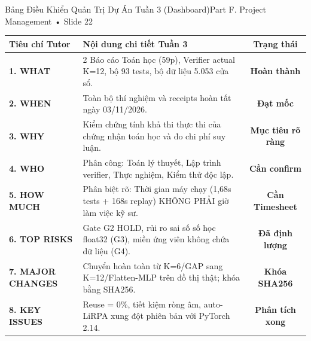 \documentclass[aspectratio=169, 10pt]{beamer}
\begin{document}
\begin{frame}{Bảng Điều Khiển Quản Trị Dự Án Tuần 3 (Dashboard)}{Part F. Project Management • Slide 22}
    \tiny
    \begin{tabular}{lp{6cm}c}
        \toprule
        \textbf{Tiêu chí Tutor} & \textbf{Nội dung chi tiết Tuần 3} & \textbf{Trạng thái} \\
        \midrule
        \textbf{1. WHAT} & 2 Báo cáo Toán học (59p), Verifier actual K=12, bộ 93 tests, bộ dữ liệu 5.053 cửa sổ. & \textcolor{MintGreen}{\textbf{Hoàn thành}} \\
        \textbf{2. WHEN} & Toàn bộ thí nghiệm và receipts hoàn tất ngày 03/11/2026. & \textcolor{MintGreen}{\textbf{Đạt mốc}} \\
        \textbf{3. WHY} & Kiểm chứng tính khả thi thực thi của chứng nhận toán học và đo chi phí suy luận. & \textcolor{MintGreen}{\textbf{Mục tiêu rõ ràng}} \\
        \textbf{4. WHO} & Phân công: Toán lý thuyết, Lập trình verifier, Thực nghiệm, Kiểm thử độc lập. & \textcolor{WarnAmber}{\textbf{Cần confirm}} \\
        \textbf{5. HOW MUCH} & Phân biệt rõ: Thời gian máy chạy (1,68s tests + 168s replay) KHÔNG PHẢI giờ làm việc kỹ sư. & \textcolor{WarnAmber}{\textbf{Cần Timesheet}} \\
        \textbf{6. TOP RISKS} & Gate G2 HOLD, rủi ro sai số số học float32 (G3), miền ứng viên không chứa dữ liệu (G4). & \textcolor{AlertRed}{\textbf{Đã định lượng}} \\
        \textbf{7. MAJOR CHANGES} & Chuyển hoàn toàn từ K=6/GAP sang K=12/Flatten-MLP trên đồ thị thật; khóa bằng SHA256. & \textcolor{MintGreen}{\textbf{Khóa SHA256}} \\
        \textbf{8. KEY ISSUES} & Reuse = 0\%, tiết kiệm ròng âm, auto-LiRPA xung đột phiên bản với PyTorch 2.14. & \textcolor{AlertRed}{\textbf{Phân tích xong}} \\
        \bottomrule
    \end{tabular}
\end{frame}
\end{document}
